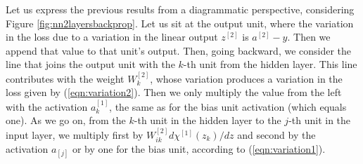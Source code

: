 \documentclass[aps,10pt]{revtex4}
\theoremstyle{plain}
\theoremstyle{definition}
\theoremstyle{remark}
\begin{document}
Let us express the previous results from a diagrammatic perspective, considering Figure \ref{fig:nn2layersbackprop}. Let us sit at the output unit, where the variation in the loss due to a variation in the linear output $z^{[2]}$ is $a^{[2]} - y$. Then we append that value to that unit's output. Then, going backward, we consider the line that joins the output unit with the $k$-th unit from the hidden layer. This line contributes with the weight $W^{[2]}_k$, whose variation produces a variation in the loss given by (\ref{eqn:variation2}). Then we only multiply the value from the left with the activation $a^{[1]}_k$, the same as for the bias unit activation (which equals one). As we go on, from the $k$-th unit in the hidden layer to the $j$-th unit in the input layer, we multiply first by $W^{[2]}_{ik}d\chi^{[1]}(z_k)/dz$ and second by the activation $a_{[j]}$ or by one for the bias unit, according to (\ref{eqn:variation1}).
\end{document}

